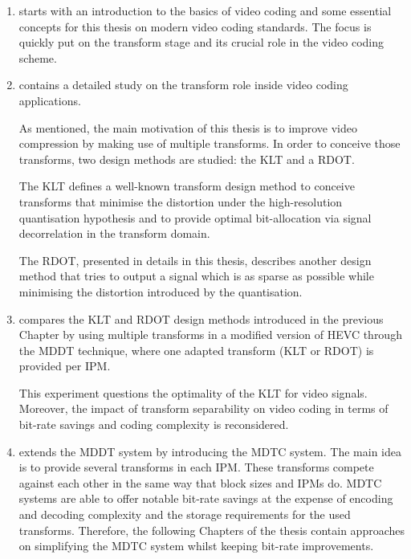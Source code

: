 \documentclass[11pt,a4paper,openright,twoside]{book}
\numberwithin{equation}{section} %
\numberwithin{figure}{section} %
\numberwithin{table}{section} %
\begin{document}
\begin{enumerate}
	[labelindent=3.8em,leftmargin=!,label={\bf Chapter \arabic{enumi}}]
	\item starts with an introduction to the basics of video coding and some
		essential concepts for this thesis on modern video coding standards.
		The focus is quickly put on the transform stage and its crucial role
		in the video coding scheme.

	\item contains a detailed study on the transform role inside video coding
		applications.

		As mentioned, the main motivation of this thesis is to improve video
		compression by making use of multiple transforms.
		In order to conceive those transforms, two design methods are studied:
		the \ac{KLT} and a \ac{RDOT}.

		The \ac{KLT} defines a well-known transform design method to conceive
		transforms that minimise the distortion under the high-resolution
		quantisation hypothesis and to provide optimal bit-allocation via
		signal decorrelation in the transform domain.

		The \ac{RDOT}, presented in details in this thesis, describes another
		design method that tries to output a signal which is as sparse as
		possible while minimising the distortion introduced by the
		quantisation.

	\item compares the \ac{KLT} and \ac{RDOT} design methods introduced in the
		previous Chapter by using multiple transforms in a modified version of
		\ac{HEVC} through the \ac{MDDT} technique, where one adapted transform
		(\ac{KLT} or \ac{RDOT}) is provided per \acl{IPM}.

		This experiment questions the optimality of the \ac{KLT} for video
		signals.
		Moreover, the impact of transform separability on video coding in
		terms of bit-rate savings and coding complexity is reconsidered.

	\item extends the \ac{MDDT} system by introducing the \ac{MDTC} system.
		The main idea is to provide several transforms in each \acl{IPM}.
		These transforms compete against each other in the same way that block
		sizes and \aclp{IPM} do.
		\ac{MDTC} systems are able to offer notable bit-rate savings at the
		expense of encoding and decoding complexity and the storage
		requirements for the used transforms.
		Therefore, the following Chapters of the thesis contain approaches on
		simplifying the \ac{MDTC} system whilst keeping bit-rate improvements.


\end{enumerate}
\end{document}
